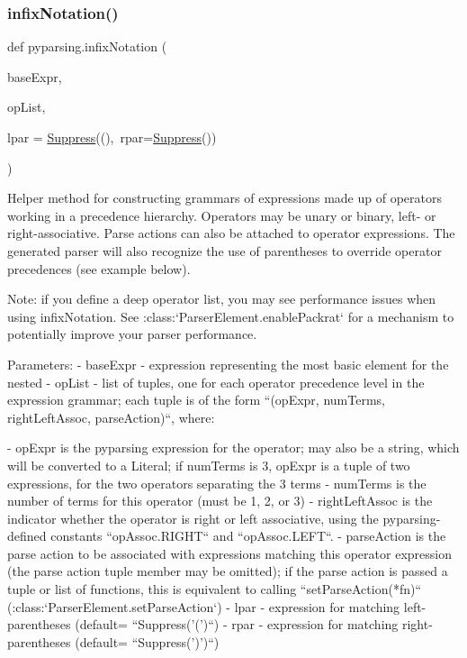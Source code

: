 \subsubsection{\texorpdfstring{infix\+Notation()}{infixNotation()}}
{\footnotesize\ttfamily def pyparsing.\+infix\+Notation (\begin{DoxyParamCaption}\item[{}]{base\+Expr,  }\item[{}]{op\+List,  }\item[{}]{lpar = {\ttfamily \hyperlink{classpyparsing_1_1Suppress}{Suppress}(\textquotesingle{}(\textquotesingle{}),~rpar=\hyperlink{classpyparsing_1_1Suppress}{Suppress}(\textquotesingle{})\textquotesingle{})} }\end{DoxyParamCaption})}

\begin{DoxyVerb}Helper method for constructing grammars of expressions made up of
operators working in a precedence hierarchy.  Operators may be unary
or binary, left- or right-associative.  Parse actions can also be
attached to operator expressions. The generated parser will also
recognize the use of parentheses to override operator precedences
(see example below).

Note: if you define a deep operator list, you may see performance
issues when using infixNotation. See
:class:`ParserElement.enablePackrat` for a mechanism to potentially
improve your parser performance.

Parameters:
 - baseExpr - expression representing the most basic element for the
   nested
 - opList - list of tuples, one for each operator precedence level
   in the expression grammar; each tuple is of the form ``(opExpr,
   numTerms, rightLeftAssoc, parseAction)``, where:

   - opExpr is the pyparsing expression for the operator; may also
     be a string, which will be converted to a Literal; if numTerms
     is 3, opExpr is a tuple of two expressions, for the two
     operators separating the 3 terms
   - numTerms is the number of terms for this operator (must be 1,
     2, or 3)
   - rightLeftAssoc is the indicator whether the operator is right
     or left associative, using the pyparsing-defined constants
     ``opAssoc.RIGHT`` and ``opAssoc.LEFT``.
   - parseAction is the parse action to be associated with
     expressions matching this operator expression (the parse action
     tuple member may be omitted); if the parse action is passed
     a tuple or list of functions, this is equivalent to calling
     ``setParseAction(*fn)``
     (:class:`ParserElement.setParseAction`)
 - lpar - expression for matching left-parentheses
   (default= ``Suppress('(')``)
 - rpar - expression for matching right-parentheses
   (default= ``Suppress(')')``)


\end{DoxyVerb}

